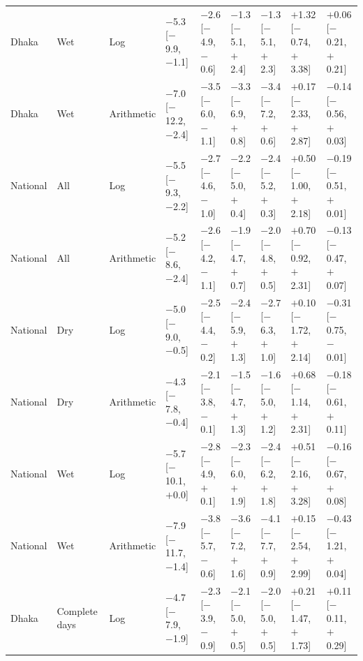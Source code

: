\begin{longtable}{L{1.2cm} L{1.1cm} L{1.4cm} C{1.75cm} C{1.75cm} C{1.75cm} C{1.75cm} C{1.75cm} C{1.75cm}}
Dhaka & Wet & Log & $-$5.3 {\scriptsize[$-$9.9, $-$1.1]} & $-$2.6 {\scriptsize[$-$4.9, $-$0.6]} & $-$1.3 {\scriptsize[$-$5.1, $+$2.4]} & $-$1.3 {\scriptsize[$-$5.1, $+$2.3]} & $+$1.32 {\scriptsize[$-$0.74, $+$3.38]} & $+$0.06 {\scriptsize[$-$0.21, $+$0.21]} \\
Dhaka & Wet & Arithmetic & $-$7.0 {\scriptsize[$-$12.2, $-$2.4]} & $-$3.5 {\scriptsize[$-$6.0, $-$1.1]} & $-$3.3 {\scriptsize[$-$6.9, $+$0.8]} & $-$3.4 {\scriptsize[$-$7.2, $+$0.6]} & $+$0.17 {\scriptsize[$-$2.33, $+$2.87]} & $-$0.14 {\scriptsize[$-$0.56, $+$0.03]} \\
National & All & Log & $-$5.5 {\scriptsize[$-$9.3, $-$2.2]} & $-$2.7 {\scriptsize[$-$4.6, $-$1.0]} & $-$2.2 {\scriptsize[$-$5.0, $+$0.4]} & $-$2.4 {\scriptsize[$-$5.2, $+$0.3]} & $+$0.50 {\scriptsize[$-$1.00, $+$2.18]} & $-$0.19 {\scriptsize[$-$0.51, $+$0.01]} \\
National & All & Arithmetic & $-$5.2 {\scriptsize[$-$8.6, $-$2.4]} & $-$2.6 {\scriptsize[$-$4.2, $-$1.1]} & $-$1.9 {\scriptsize[$-$4.7, $+$0.7]} & $-$2.0 {\scriptsize[$-$4.8, $+$0.5]} & $+$0.70 {\scriptsize[$-$0.92, $+$2.31]} & $-$0.13 {\scriptsize[$-$0.47, $+$0.07]} \\
National & Dry & Log & $-$5.0 {\scriptsize[$-$9.0, $-$0.5]} & $-$2.5 {\scriptsize[$-$4.4, $-$0.2]} & $-$2.4 {\scriptsize[$-$5.9, $+$1.3]} & $-$2.7 {\scriptsize[$-$6.3, $+$1.0]} & $+$0.10 {\scriptsize[$-$1.72, $+$2.14]} & $-$0.31 {\scriptsize[$-$0.75, $-$0.01]} \\
National & Dry & Arithmetic & $-$4.3 {\scriptsize[$-$7.8, $-$0.4]} & $-$2.1 {\scriptsize[$-$3.8, $-$0.1]} & $-$1.5 {\scriptsize[$-$4.7, $+$1.3]} & $-$1.6 {\scriptsize[$-$5.0, $+$1.2]} & $+$0.68 {\scriptsize[$-$1.14, $+$2.31]} & $-$0.18 {\scriptsize[$-$0.61, $+$0.11]} \\
National & Wet & Log & $-$5.7 {\scriptsize[$-$10.1, $+$0.0]} & $-$2.8 {\scriptsize[$-$4.9, $+$0.1]} & $-$2.3 {\scriptsize[$-$6.0, $+$1.9]} & $-$2.4 {\scriptsize[$-$6.2, $+$1.8]} & $+$0.51 {\scriptsize[$-$2.16, $+$3.28]} & $-$0.16 {\scriptsize[$-$0.67, $+$0.08]} \\
National & Wet & Arithmetic & $-$7.9 {\scriptsize[$-$11.7, $-$1.4]} & $-$3.8 {\scriptsize[$-$5.7, $-$0.6]} & $-$3.6 {\scriptsize[$-$7.2, $+$1.6]} & $-$4.1 {\scriptsize[$-$7.7, $+$0.9]} & $+$0.15 {\scriptsize[$-$2.54, $+$2.99]} & $-$0.43 {\scriptsize[$-$1.21, $+$0.04]} \\
Dhaka & Complete days & Log & $-$4.7 {\scriptsize[$-$7.9, $-$1.9]} & $-$2.3 {\scriptsize[$-$3.9, $-$0.9]} & $-$2.1 {\scriptsize[$-$5.0, $+$0.5]} & $-$2.0 {\scriptsize[$-$5.0, $+$0.5]} & $+$0.21 {\scriptsize[$-$1.47, $+$1.73]} & $+$0.11 {\scriptsize[$-$0.11, $+$0.29]} \\

\end{longtable}
